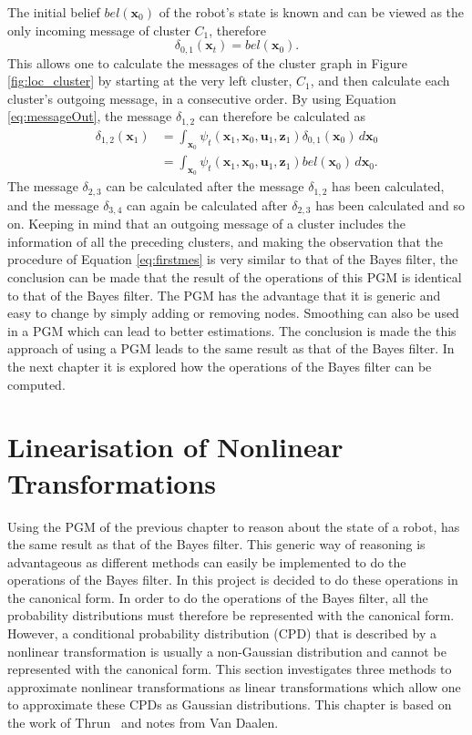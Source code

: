 \documentclass[12pt,oneside,openany,a4paper, %
afrikaans,english,
]{memoir}
\numberwithin{equation}{chapter}
\begin{document}
{The initial belief $bel(\bm{x}_0)$ of the robot's state is known and can be viewed as the only incoming message of cluster $C_1$, therefore
\begin{equation}
\delta_{0,1}(\bm{x}_t) = bel(\bm{x}_0).
\end{equation}
This allows one to calculate the messages of the cluster graph in Figure \ref{fig:loc_cluster} by starting at the very left cluster, $C_1$, and then calculate each cluster's outgoing message, in a consecutive order. By using Equation \ref{eq:messageOut}, the message $\delta_{1,2}$ can therefore be calculated as
\begin{equation}\label{eq:firstmes}
\begin{split}
\delta_{1,2}(\bm{x}_1) & =  \int_{\bm{x}_{0}}\psi_t(\bm{x}_1, \bm{x}_{0}, \bm{u}_1, \bm{z}_1)\delta_{0,1}(\bm{x}_{0})\,d\bm{x}_{0}\\
& = \int_{\bm{x}_{0}}\psi_t(\bm{x}_1, \bm{x}_{0}, \bm{u}_1, \bm{z}_1)bel(\bm{x}_{0})\,d\bm{x}_{0}.
\end{split}
\end{equation}
The message $\delta_{2,3}$ can be calculated after the message $\delta_{1,2}$ has been calculated, and the message $\delta_{3,4}$ can again be calculated after $\delta_{2,3}$ has been calculated and so on. Keeping in mind that an outgoing message of a cluster includes the information of all the preceding clusters, and making the observation that the procedure of Equation \ref{eq:firstmes} is very similar to that of the Bayes filter, the conclusion can be made that the result of the operations of this PGM is identical to that of the Bayes filter. The PGM has the advantage that it is generic and easy to change by simply adding or removing nodes. Smoothing can also be used in a PGM which can lead to better estimations. The conclusion is made the this approach of using a PGM leads to the same result as that of the Bayes filter. In the next chapter it is explored how the operations of the Bayes filter can be computed.

\chapter{Linearisation of Nonlinear Transformations}\label{sec:numInt}
Using the PGM of the previous chapter to reason about the state of a robot, has the same result as that of the Bayes filter. This generic way of reasoning is advantageous as different methods can easily be implemented to do the operations of the Bayes filter. In this project is decided to do these operations in the canonical form. In order to do the operations of the Bayes filter, all the probability distributions must therefore be represented with the canonical form. However, a conditional probability distribution (CPD) that is described by a nonlinear transformation is usually a non-Gaussian distribution and cannot be represented with the canonical form. This section investigates three methods to approximate nonlinear transformations as linear transformations which allow one to approximate these CPDs as Gaussian distributions. This chapter is based on the work of Thrun~\citep{thrun} and notes from Van Daalen.

}
\end{document}
